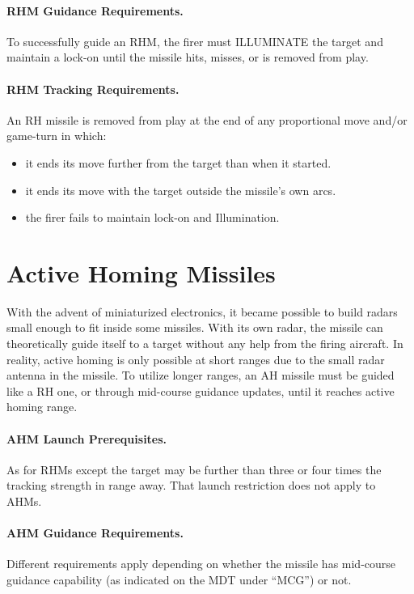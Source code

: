 \paragraph{RHM Guidance Requirements.} To successfully guide an RHM, the firer must ILLUMINATE the target and maintain a lock-on until the missile hits, misses, or is removed from play.

\paragraph{RHM Tracking Requirements.} An RH missile is removed from play at the end of any proportional move and/or game-turn in which:

\begin{itemize}

    \item it ends its move further from the target than when it started.

    \item it ends its move with the target outside the missile's own  arcs.

    \item the firer fails to maintain lock-on and Illumination.

\end{itemize}

\section{Active Homing Missiles}
\label{rule:active-radar-homing-missiles}

With the advent of miniaturized electronics, it became possible to build radars small enough to fit inside some missiles. With its own radar, the missile can theoretically guide itself to a target without any help from the firing aircraft. In reality, active homing is only possible at short ranges due to the small radar antenna in the missile. To utilize longer ranges, an AH missile must be guided like a RH one, or through mid-course guidance updates, until it reaches active homing range.

\paragraph{AHM Launch Prerequisites.} As for RHMs except the target may be further than three or four  times the tracking strength in range away. That launch restriction does not apply to AHMs.

\paragraph{AHM Guidance Requirements.} Different requirements apply depending on whether the missile has mid-course guidance capability (as indicated on the MDT under “MCG”) or not.


